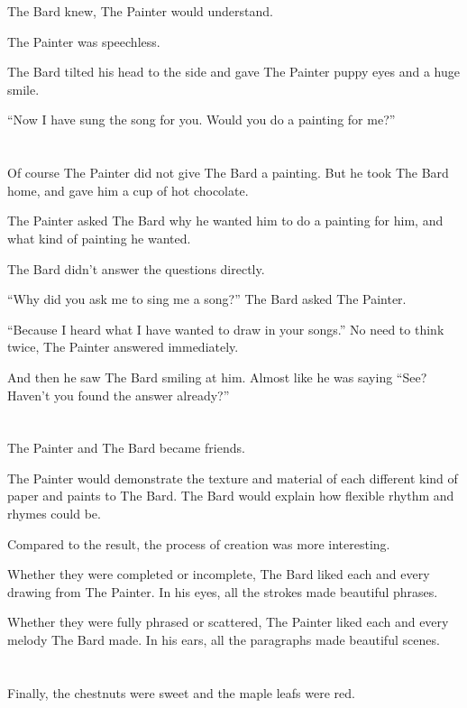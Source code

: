\documentclass{article}
\begin{document}
The Bard knew, The Painter would understand.

The Painter was speechless.

The Bard tilted his head to the side and gave The Painter puppy eyes and a huge smile.

“Now I have sung the song for you. Would you do a painting for me?”

\section{} %
Of course The Painter did not give The Bard a painting. But he took The Bard home, and gave him a cup of hot chocolate.
\par The Painter asked The Bard why he wanted him to do a painting for him, and what kind of painting he wanted.
\par The Bard didn't answer the questions directly.
\par “Why did you ask me to sing me a song?” The Bard asked The Painter.
\par “Because I heard what I have wanted to draw in your songs.” No need to think twice, The Painter answered immediately.
\par And then he saw The Bard smiling at him. Almost like he was saying “See? Haven't you found the answer already?”

\section{} %
The Painter and The Bard became friends.

The Painter would demonstrate the texture and material of each different kind of paper and paints to The Bard. The Bard would explain how flexible rhythm and rhymes could be.

Compared to the result, the process of creation was more interesting.

Whether they were completed or incomplete, The Bard liked each and every drawing from The Painter. In his eyes, all the strokes made beautiful phrases.

Whether they were fully phrased or scattered, The Painter liked each and every melody The Bard made. In his ears, all the paragraphs made beautiful scenes. 

\section{} %
Finally, the chestnuts were sweet and the maple leafs were red.
\end{document}

